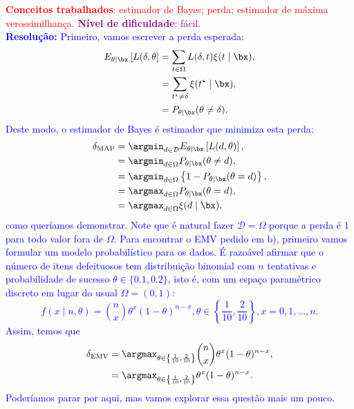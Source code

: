 \textcolor{red}{\textbf{Conceitos trabalhados}: estimador de Bayes; perda; estimador de máxima verossimilhança.}
\textcolor{purple}{\textbf{Nível de dificuldade}: fácil.}\\
\textcolor{blue}{
\textbf{Resolução:}
Primeiro, vamos escrever a perda esperada:
\begin{align*}
    E_{\theta \mid \bx}\left[L(\delta, \theta\right] &= \sum_{t \in \Omega} L(\delta, t)\xi(t \mid \bx),\\
    &= \sum_{t^\star \neq \delta} \xi(t^\star \mid \bx),\\
    &= P_{\theta \mid \bx}(\theta \neq \delta).
\end{align*}
Deste modo, o estimador de Bayes é estimador que minimiza esta perda:
\begin{align*}
    \delta_{\textrm{MAP}} &= \argmin_{d \in \mathcal{D}} E_{\theta \mid \bx}\left[L(d, \theta)\right],\\
    &= \argmin_{d \in \Omega} P_{\theta \mid \bx}(\theta \neq d),\\
    &= \argmin_{d \in \Omega} \left\{ 1- P_{\theta \mid \bx}(\theta = d) \right\},\\
    &= \argmax_{d \in \Omega} P_{\theta \mid \bx}(\theta = d),\\
    &= \argmax_{d \in \Omega} \xi(d \mid \bx),
\end{align*}
como queríamos demonstrar.
Note que é natural fazer $\mathcal{D} = \Omega$ porque a perda é $1$ para todo valor fora de $\Omega$.
Para encontrar o EMV pedido em b), primeiro vamos formular um modelo probabilístico para os dados.
É razoável afirmar que o número de itens defeituosos tem distribuição binomial com $n$ tentativas e probabilidade de sucesso $\theta \in \{0.1, 0.2\}$, isto é, com um espaço paramétrico discreto em lugar do usual $\Omega = (0, 1)$:
\begin{equation*}
    f(x \mid n, \theta) = \binom{n}{x} \theta^{x} (1-\theta)^{n-x}, \theta \in \left\{\frac{1}{10}, \frac{2}{10}\right\}, x = 0, 1, \ldots, n. 
\end{equation*}
Assim, temos que 
\begin{align*}
     \delta_{\textrm{EMV}} &= \argmax_{\theta \in \left\{\frac{1}{10}, \frac{2}{10}\right\}} \binom{n}{x} \theta^{x} (1-\theta)^{n-x},\\
          &= \argmax_{\theta \in \left\{\frac{1}{10}, \frac{2}{10}\right\}} \theta^{x} (1-\theta)^{n-x}.
\end{align*}
Poderíamos parar por aqui, mas vamos explorar essa questão mais um pouco.
}

